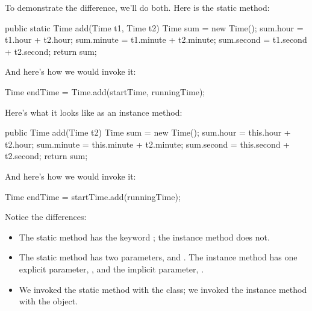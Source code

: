 To demonstrate the difference, we'll do both.
Here is the static method:


\begin{code}
public static Time add(Time t1, Time t2) {
    Time sum = new Time();
    sum.hour = t1.hour + t2.hour;
    sum.minute = t1.minute + t2.minute;
    sum.second = t1.second + t2.second;
    return sum;
}
\end{code}

And here's how we would invoke it:

\begin{code}
Time endTime = Time.add(startTime, runningTime);
\end{code}

Here's what it looks like as an instance method:


\begin{code}
public Time add(Time t2) {
    Time sum = new Time();
    sum.hour = this.hour + t2.hour;
    sum.minute = this.minute + t2.minute;
    sum.second = this.second + t2.second;
    return sum;
}
\end{code}

And here's how we would invoke it:

\begin{code}
Time endTime = startTime.add(runningTime);
\end{code}

Notice the differences:

\begin{itemize}

\item The static method has the keyword ; the instance method does not.

\item The static method has two parameters,  and .
The instance method has one explicit parameter, , and the implicit parameter, .

\item We invoked the static method with the  class;
we invoked the instance method with the  object.

\end{itemize}


